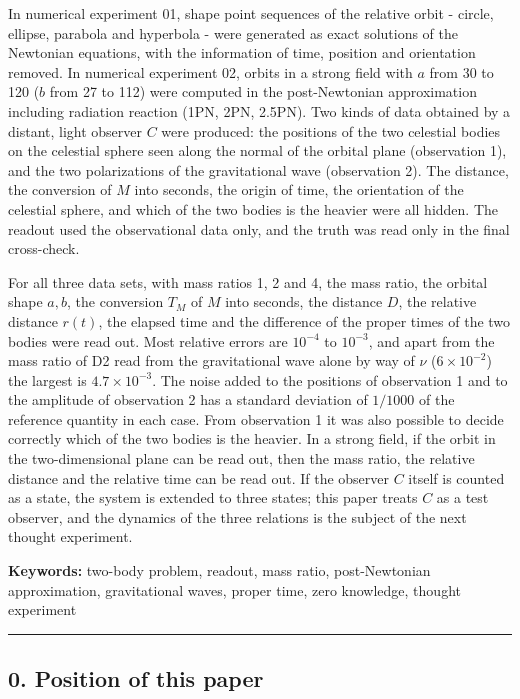 \documentclass[
  a4paper,
]{article}
\begin{document}
In numerical experiment 01, shape point sequences of the relative orbit
- circle, ellipse, parabola and hyperbola - were generated as exact
solutions of the Newtonian equations, with the information of time,
position and orientation removed. In numerical experiment 02, orbits in
a strong field with \(a\) from 30 to 120 (\(b\) from 27 to 112) were
computed in the post-Newtonian approximation including radiation
reaction (1PN, 2PN, 2.5PN). Two kinds of data obtained by a distant,
light observer \(C\) were produced: the positions of the two celestial
bodies on the celestial sphere seen along the normal of the orbital
plane (observation 1), and the two polarizations of the gravitational
wave (observation 2). The distance, the conversion of \(M\) into
seconds, the origin of time, the orientation of the celestial sphere,
and which of the two bodies is the heavier were all hidden. The readout
used the observational data only, and the truth was read only in the
final cross-check.

For all three data sets, with mass ratios 1, 2 and 4, the mass ratio,
the orbital shape \(a, b\), the conversion \(T_M\) of \(M\) into
seconds, the distance \(D\), the relative distance \(r(t)\), the elapsed
time and the difference of the proper times of the two bodies were read
out. Most relative errors are \(10^{-4}\) to \(10^{-3}\), and apart from
the mass ratio of D2 read from the gravitational wave alone by way of
\(\nu\) (\(6\times10^{-2}\)) the largest is \(4.7\times10^{-3}\). The
noise added to the positions of observation 1 and to the amplitude of
observation 2 has a standard deviation of \(1/1000\) of the reference
quantity in each case. From observation 1 it was also possible to decide
correctly which of the two bodies is the heavier. In a strong field, if
the orbit in the two-dimensional plane can be read out, then the mass
ratio, the relative distance and the relative time can be read out. If
the observer \(C\) itself is counted as a state, the system is extended
to three states; this paper treats \(C\) as a test observer, and the
dynamics of the three relations is the subject of the next thought
experiment.

\textbf{Keywords:} two-body problem, readout, mass ratio, post-Newtonian
approximation, gravitational waves, proper time, zero knowledge, thought
experiment

\begin{center}\rule{0.5\linewidth}{0.5pt}\end{center}

\subsection{0. Position of this paper}\label{position-of-this-paper}
\end{document}
